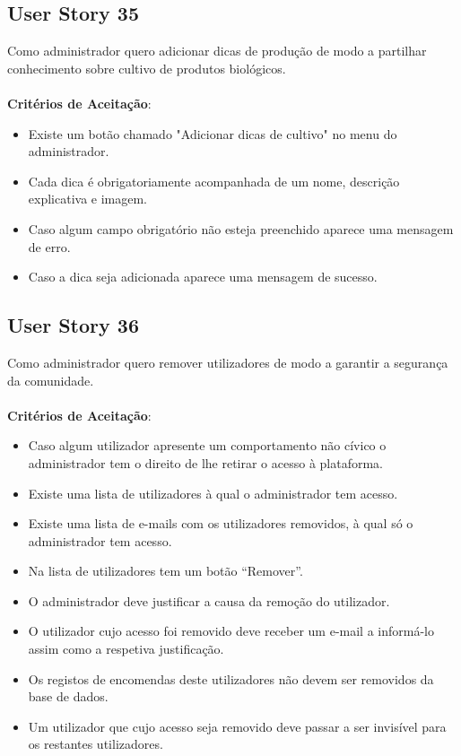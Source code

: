 \documentclass[a4paper,11pt]{article}
\begin{document}
\subsection{User Story 35}
Como administrador quero adicionar dicas de produção de modo a partilhar conhecimento sobre cultivo de produtos biológicos.\\\\
\textbf{Critérios de Aceitação}:
\begin{itemize}
  \item Existe um botão chamado "Adicionar dicas de cultivo" no menu do administrador.
  \item Cada dica é obrigatoriamente acompanhada de um nome, descrição explicativa e imagem.
  \item Caso algum campo obrigatório não esteja preenchido aparece uma mensagem de erro.
  \item Caso a dica seja adicionada aparece uma mensagem de sucesso.
\end{itemize}
\subsection{User Story 36}
Como administrador quero remover utilizadores de modo a garantir a segurança da comunidade.\\\\
\textbf{Critérios de Aceitação}:
\begin{itemize}
  \item Caso algum utilizador apresente um comportamento não cívico o administrador tem o direito de lhe retirar o acesso à plataforma.
  \item Existe uma lista de utilizadores à qual o administrador tem acesso.
  \item Existe uma lista de e-mails com os utilizadores removidos, à qual só o administrador tem acesso.
  \item Na lista de utilizadores tem um botão “Remover”.
  \item O administrador deve justificar a causa da remoção do utilizador.
  \item O utilizador cujo acesso foi removido deve receber um e-mail a informá-lo assim como a respetiva justificação.
  \item Os registos de encomendas deste utilizadores não devem ser removidos da base de dados.
  \item Um utilizador que cujo acesso seja removido deve passar a ser invisível para os restantes utilizadores.
\end{itemize}
\end{document}
